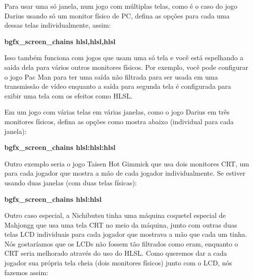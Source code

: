 \documentclass[letterpaper,10pt,brazil]{sphinxmanual}
\begin{document}
\begin{DUlineblock}{0em}
\begin{DUlineblock}{\DUlineblockindent}
\item[] Para usar uma só janela, num jogo com múltiplas telas, como é o caso do jogo Darius usando só um monitor físico de PC, defina as opções para cada uma dessas telas individualmente, assim:
\item[] 
\item[]
\begin{DUlineblock}{\DUlineblockindent}
\item[] \textbf{bgfx\_screen\_chains hlsl,hlsl,hlsl}
\item[] 
\end{DUlineblock}
\item[] Isso também funciona com jogos que usam uma só tela e você está espelhando a saída dela para vários outros monitores físicos. Por exemplo, você pode configurar o jogo Pac Man para ter uma saída não filtrada para ser usada em uma transmissão de vídeo enquanto a saída para segunda tela é configurada para exibir uma tela com os efeitos como HLSL.
\item[] 
\item[] Em um jogo com várias telas em várias janelas, como o jogo Darius em três monitores físicos, defina as opções como mostra abaixo (individual para cada janela):
\item[] 
\item[]
\begin{DUlineblock}{\DUlineblockindent}
\item[] \textbf{bgfx\_screen\_chains hlsl:hlsl:hlsl}
\item[] 
\end{DUlineblock}
\item[] Outro exemplo seria o jogo Taisen Hot Gimmick que usa dois monitores CRT, um para cada jogador que mostra a mão de cada jogador individualmente. Se estiver usando duas janelas (com duas telas físicas):
\item[] 
\item[]
\begin{DUlineblock}{\DUlineblockindent}
\item[] \textbf{bgfx\_screen\_chains hlsl:hlsl}
\item[] 
\end{DUlineblock}
\item[] Outro caso especial, a Nichibutsu tinha uma máquina coquetel especial de Mahjongg que usa uma tela CRT no meio da máquina, junto com outras duas telas LCD individuais para cada jogador que mostrava a mão que cada um tinha. Nós gostaríamos que os LCDs não fossem tão filtrados como eram, enquanto o CRT seria melhorado através do uso do HLSL. Como queremos dar a cada jogador sua própria tela cheia (dois monitores físicos) junto com o LCD, nós fazemos assim:

\end{DUlineblock}
\end{DUlineblock}
\end{document}
